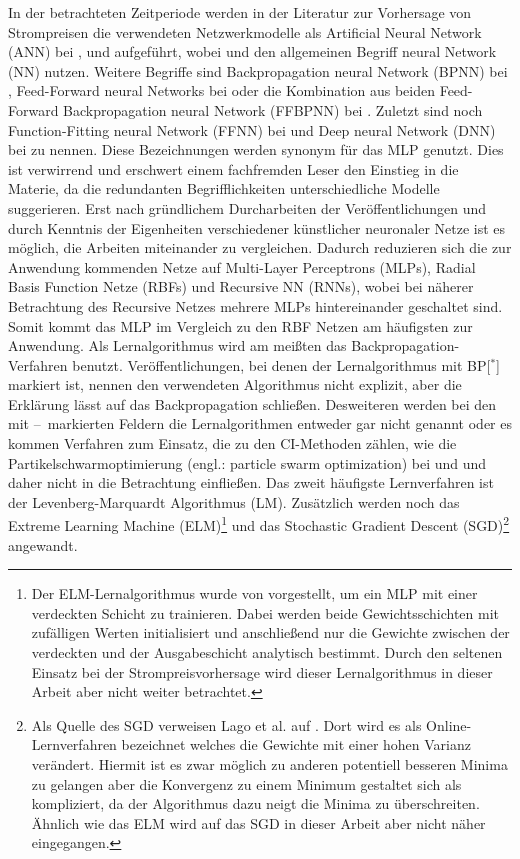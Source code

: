 In der betrachteten Zeitperiode werden in der Literatur zur Vorhersage von Strompreisen die verwendeten Netzwerkmodelle als Artificial Neural Network (ANN) bei \citet{Mirakyan2017}, \citet{Gao2017} und \citet{Sandhu2016} aufgeführt, wobei \citet{Davo2016} und \citet{Domanski2017} den allgemeinen Begriff neural Network (NN) nutzen. Weitere Begriffe sind Backpropagation neural Network (BPNN) bei \citet{Wang2017}, Feed-Forward neural Networks bei \citet{Keles2016} oder die Kombination aus beiden Feed-Forward Backpropagation neural Network (FFBPNN) bei \citet{Peter2016}. Zuletzt sind noch Function-Fitting neural Network (FFNN) bei \citet{Marcos2017} und Deep neural Network (DNN) bei \citet{Lago2018} zu nennen. Diese Bezeichnungen werden synonym für das MLP genutzt. Dies ist verwirrend und erschwert einem fachfremden Leser den Einstieg in die Materie, da die redundanten Begrifflichkeiten unterschiedliche Modelle suggerieren. Erst nach gründlichem Durcharbeiten der Veröffentlichungen und durch Kenntnis der Eigenheiten verschiedener künstlicher neuronaler Netze ist es möglich, die Arbeiten miteinander zu vergleichen. Dadurch reduzieren sich die zur Anwendung kommenden Netze auf Multi-Layer Perceptrons (MLPs), Radial Basis Function Netze (RBFs) und Recursive NN (RNNs), wobei bei näherer Betrachtung des Recursive Netzes mehrere MLPs hintereinander geschaltet sind. Somit kommt das MLP im Vergleich zu den RBF Netzen am häufigsten zur Anwendung. Als Lernalgorithmus wird am meißten das Backpropagation-Verfahren benutzt. Veröffentlichungen, bei denen der Lernalgorithmus mit \gls{BP}[$^{*}$] markiert ist, nennen den verwendeten Algorithmus nicht explizit, aber die Erklärung lässt auf das Backpropagation schließen. Desweiteren werden bei den mit \glqq --\grqq~markierten Feldern die Lernalgorithmen entweder gar nicht genannt oder es kommen Verfahren zum Einsatz, die zu den CI-Methoden zählen, wie die Partikelschwarmoptimierung (engl.: particle swarm optimization) bei \citet{Talari2017} und \citet{Jiang2016} und daher nicht in die Betrachtung einfließen. Das zweit häufigste Lernverfahren ist der Levenberg-Marquardt Algorithmus (\gls{LM}). Zusätzlich werden noch das Extreme Learning Machine (\gls{ELM})\footnote{Der ELM-Lernalgorithmus wurde von \citet{Huang2004} vorgestellt, um ein MLP mit einer verdeckten Schicht zu trainieren. Dabei werden beide Gewichtsschichten mit zufälligen Werten initialisiert und anschließend nur die Gewichte zwischen der verdeckten und der Ausgabeschicht analytisch bestimmt. Durch den seltenen Einsatz bei der Strompreisvorhersage wird dieser Lernalgorithmus in dieser Arbeit aber nicht weiter betrachtet.} und das Stochastic Gradient Descent (\gls{SGD})\footnote{Als Quelle des \gls{SGD} verweisen Lago et al. auf \citet{Ruder2016}. Dort wird es als Online-Lernverfahren bezeichnet welches die Gewichte mit einer hohen Varianz verändert. Hiermit ist es zwar möglich zu anderen potentiell besseren Minima zu gelangen aber die Konvergenz zu einem Minimum gestaltet sich als kompliziert, da der Algorithmus dazu neigt die Minima zu überschreiten. Ähnlich wie das ELM wird auf das SGD in dieser Arbeit aber nicht näher eingegangen.} angewandt. 

